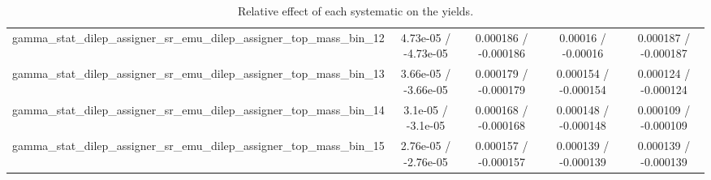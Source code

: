 \documentclass[10pt]{article}
\begin{document}
\begin{table}[htbp]
\begin{center}
\begin{tabular}{|c|c|c|c|c|}
  gamma_stat_dilep_assigner_sr_emu_dilep_assigner_top_mass_bin_12 & 4.73e-05 / -4.73e-05 & 0.000186 / -0.000186 & 0.00016 / -0.00016 & 0.000187 / -0.000187 \\ 
  gamma_stat_dilep_assigner_sr_emu_dilep_assigner_top_mass_bin_13 & 3.66e-05 / -3.66e-05 & 0.000179 / -0.000179 & 0.000154 / -0.000154 & 0.000124 / -0.000124 \\ 
  gamma_stat_dilep_assigner_sr_emu_dilep_assigner_top_mass_bin_14 & 3.1e-05 / -3.1e-05 & 0.000168 / -0.000168 & 0.000148 / -0.000148 & 0.000109 / -0.000109 \\ 
  gamma_stat_dilep_assigner_sr_emu_dilep_assigner_top_mass_bin_15 & 2.76e-05 / -2.76e-05 & 0.000157 / -0.000157 & 0.000139 / -0.000139 & 0.000139 / -0.000139 \\ 
\hline 
\end{tabular} 
\caption{Relative effect of each systematic on the yields.} 
\end{center} 
\end{table} 
\end{document}
